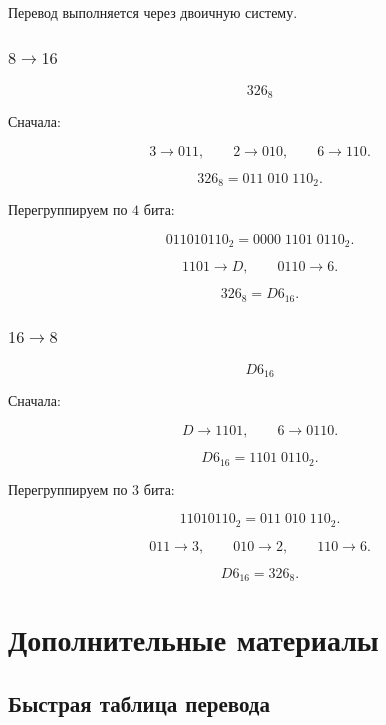 \documentclass[../final.tex]{subfiles}
\begin{document}
Перевод выполняется через двоичную систему.


\subsubsection{\texorpdfstring{$8 \to 16$}{8 → 16}}

\[
326_8
\]

Сначала:

\[
3\longrightarrow011,
\qquad
2\longrightarrow010,
\qquad
6\longrightarrow110.
\]

\[
326_8
=
011\;010\;110_2.
\]

Перегруппируем по $4$ бита:

\[
011010110_2
=
0000\;1101\;0110_2.
\]

\[
1101\longrightarrow D,
\qquad
0110\longrightarrow6.
\]

\[
326_8=D6_{16}.
\]


\subsubsection{\texorpdfstring{$16 \to 8$}{16 → 8}}

\[
D6_{16}
\]

Сначала:

\[
D\longrightarrow1101,
\qquad
6\longrightarrow0110.
\]

\[
D6_{16}
=
1101\;0110_2.
\]

Перегруппируем по $3$ бита:

\[
11010110_2
=
011\;010\;110_2.
\]

\[
011\longrightarrow3,
\qquad
010\longrightarrow2,
\qquad
110\longrightarrow6.
\]

\[
D6_{16}=326_8.
\]

\newpage


\section{Дополнительные материалы}

\subsection{Быстрая таблица перевода}
\end{document}
